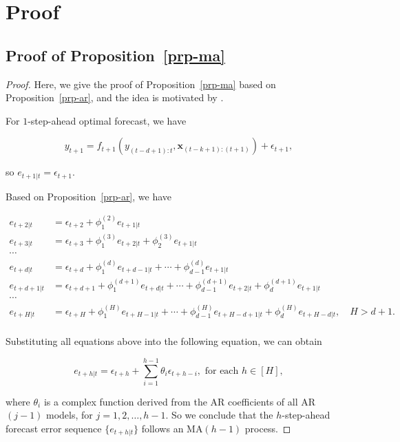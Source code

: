 \documentclass[
  11pt,
  a4paper,
]{article}
\theoremstyle{plain}
\theoremstyle{plain}
\theoremstyle{remark}
\begin{document}
\section{Proof}\label{sec-proof}

\subsection{\texorpdfstring{Proof of
Proposition~\ref{prp-ma}}{Proof of Proposition~}}\label{sec-proof_ma}

\begin{proof}
Here, we give the proof of Proposition~\ref{prp-ma} based on
Proposition~\ref{prp-ar}, and the idea is motivated by
\textcite{sommer2023}.

For \(1\)-step-ahead optimal forecast, we have

\[
y_{t+1} = f_{t+1}(y_{(t-d+1):t},\bm{x}_{(t-k+1):(t+1)}) + \epsilon_{t+1},
\]

so \(e_{t+1|t}=\epsilon_{t+1}\).

Based on Proposition~\ref{prp-ar}, we have

\[
\begin{aligned}
e_{t+2|t} &= \epsilon_{t+2} + \phi_{1}^{(2)}e_{t+1|t} \\
e_{t+3|t} &= \epsilon_{t+3} + \phi_{1}^{(3)}e_{t+2|t} + \phi_{2}^{(3)}e_{t+1|t} \\
\cdots \\
e_{t+d|t} &= \epsilon_{t+d} + \phi_{1}^{(d)}e_{t+d-1|t} + \cdots + \phi_{d-1}^{(d)}e_{t+1|t} \\
e_{t+d+1|t} &= \epsilon_{t+d+1} + \phi_{1}^{(d+1)}e_{t+d|t} + \cdots + \phi_{d-1}^{(d+1)}e_{t+2|t} + \phi_{d}^{(d+1)}e_{t+1|t} \\
\cdots \\
e_{t+H|t} &= \epsilon_{t+H} + \phi_{1}^{(H)}e_{t+H-1|t} + \cdots + \phi_{d-1}^{(H)}e_{t+H-d+1|t} + \phi_{d}^{(H)}e_{t+H-d|t}, \quad H > d + 1. \\
\end{aligned}
\]

Substituting all equations above into the following equation, we can
obtain

\[
e_{t+h|t} = \epsilon_{t+h} + \sum_{i=1}^{h-1}\theta_{i}\epsilon_{t+h-i}, \text{ for each } h\in[H],
\]

where \(\theta_{i}\) is a complex function derived from the AR
coefficients of all AR\((j-1)\) models, for \(j = 1,2,\ldots,h-1\). So
we conclude that the \(h\)-step-ahead forecast error sequence
\(\{e_{t+h|t}\}\) follows an MA\((h-1)\) process.
\end{proof}
\end{document}
